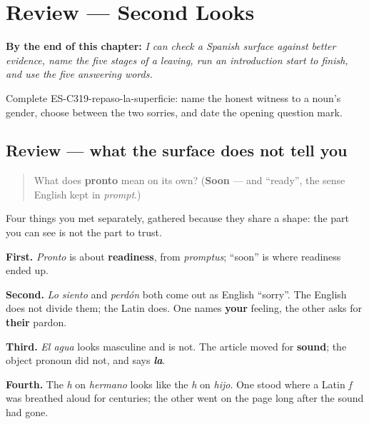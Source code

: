 
\chapter{Review --- Second Looks}
\label{ch:repaso-la-superficie}

\begin{chapteropening}
\textbf{By the end of this chapter:} \emph{I can check a Spanish surface against better evidence, name the five stages of a leaving, run an introduction start to finish, and use the five answering words.}

Complete ES-C319-repaso-la-superficie: name the honest witness to a noun's gender, choose between the two sorries, and date the opening question mark.
\end{chapteropening}

\section[(review)]{Review — what the surface does not tell you}

\label{lesson:ES-C319-repaso-la-superficie}



\begin{quote}
What does \textbf{pronto} mean on its own? (\textbf{Soon} — and \textquotedblleft{}ready\textquotedblright{}, the sense English kept in \emph{prompt}.)
\end{quote}

\begin{grammarlens}[title={What you've built}]
Four things you met separately, gathered because they share a shape: the part you can see is not the part to trust.

\textbf{First.} \emph{Pronto} is about \textbf{readiness}, from \emph{promptus}; \textquotedblleft{}soon\textquotedblright{} is where readiness ended up.

\textbf{Second.} \emph{Lo siento} and \emph{perdón} both come out as English \textquotedblleft{}sorry\textquotedblright{}. The English does not divide them; the Latin does. One names \textbf{your} feeling, the other asks for \textbf{their} pardon.

\textbf{Third.} \emph{El agua} looks masculine and is not. The article moved for \textbf{sound}; the object pronoun did not, and says \emph{\textbf{la}}.

\textbf{Fourth.} The \emph{h} on \emph{hermano} looks like the \emph{h} on \emph{hijo}. One stood where a Latin \emph{f} was breathed aloud for centuries; the other went on the page long after the sound had gone.
\end{grammarlens}


